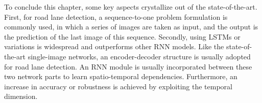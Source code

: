 To conclude this chapter, some key aspects crystallize out of the state-of-the-art.
First, for road lane detection, a sequence-to-one problem formulation is commonly used, in which a series of images are taken as input, and the output is the prediction of the last image of this sequence.
Secondly, using \ac{LSTM}s or variations is widespread and outperforms other \ac{RNN} models.
Like the state-of-the-art single-image networks, an encoder-decoder structure is usually adopted for road lane detection.
An \ac{RNN} module is usually incorporated between these two network parts to learn spatio-temporal dependencies.
Furthermore, an increase in accuracy or robustness is achieved by exploiting the temporal dimension.
